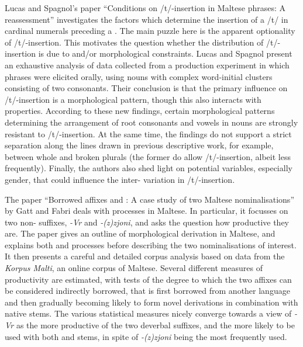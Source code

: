\documentclass[output=paper]{LSP/langsci}
\begin{document}
Lucas and Spagnol's paper %
``Conditions on %
/t/-insertion in Maltese  phrases: A reassessment''
investigates the factors which determine the insertion of a /t/ in
cardinal numerals preceding a . The main puzzle here is the
apparent optionality of /t/-insertion. This motivates the question
whether the distribution of /t/-insertion is due to 
and/or morphological constraints. Lucas and Spagnol present an
exhaustive analysis of data collected from a production experiment in
which  phrases were elicited orally, using nouns with complex
word-initial clusters consisting of two consonants. Their conclusion
is that the primary influence on /t/-insertion is %
a morphological pattern, though this also interacts with 
properties. According to %
these new findings, certain
morphological patterns determining the arrangement of root consonants
and vowels in  nouns are strongly resistant to /t/-insertion. At
the same time, the findings do not support a strict separation along
the lines drawn in previous descriptive work, for example, between
whole and broken plurals (the former do allow /t/-insertion, albeit
less frequently). Finally, the authors also shed light on potential
 variables, especially gender, that could influence the
inter- variation in /t/-insertion.

The paper ``Borrowed affixes and : A case
study of two Maltese nominalisations'' by Gatt and Fabri deals with
 processes in Maltese. In particular, it focusses on two
non-  suffixes, {\em -Vr} and {\em -(z)zjoni}, and
asks the question how productive they are. The paper gives an outline
of morphological derivation in Maltese, and explains both  and
  processes before describing the two
nominalisations of interest. It then presents a careful and detailed
corpus analysis based on data from the {\em
  Korpus Malti}, an online corpus of Maltese. Several different measures of productivity are
estimated, with tests of the degree to which
the two affixes can be
considered indirectly borrowed, that is
first borrowed from
another language and %
then gradually becoming likely to form novel derivations in combination
with native stems.  The various statistical measures nicely
converge towards a view of {\em -Vr} as the more productive of the two
deverbal suffixes, and the more likely to be used with both 
and  stems, in spite of {\em -(z)zjoni} being the most
frequently used.
\end{document}

